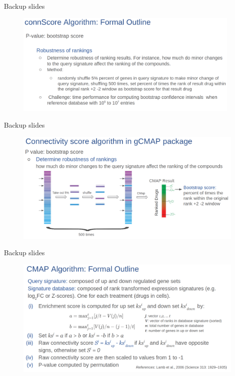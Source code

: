 \documentclass[10pt]{beamer}
\begin{document}
\begin{frame}[fragile]{Backup slides}
    \begin{figure}
        \includegraphics[width=11cm]{demo/images/connScore_algo2.png}
    \end{figure}
\end{frame}
\begin{frame}[fragile]{Backup slides}
    \begin{figure}
        \includegraphics[width=12cm]{demo/images/connScore_boot_score.png}
    \end{figure}
\end{frame}
\begin{frame}[fragile]{Backup slides}
    \begin{figure}
        \includegraphics[width=12cm]{demo/images/cmap_algo.png}
    \end{figure}
\end{frame}
\end{document}

